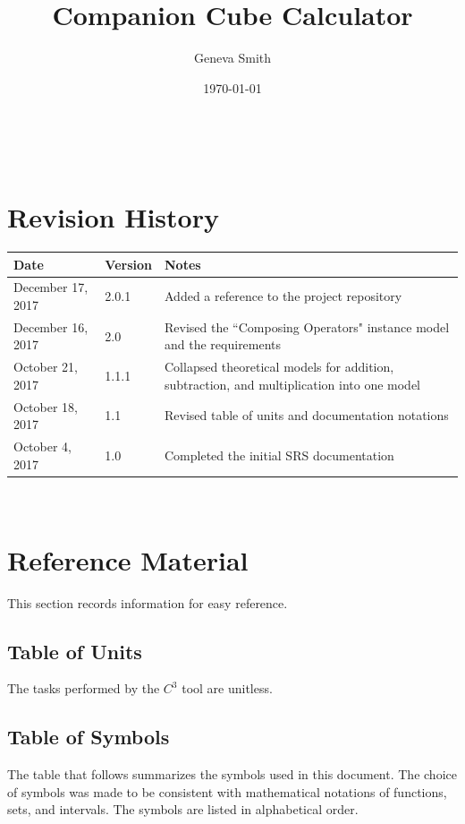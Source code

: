 \documentclass[12pt]{article}
\newcommand{\prognameAbbrv}{$C^{3}$}
\begin{document}
\title{Companion Cube Calculator} 
\author{Geneva Smith}
\date{\today}
	
\maketitle

~\newpage


\section{Revision History}

\begin{tabularx}{\textwidth}{p{3cm}p{2cm}X}
\toprule {\bf Date} & {\bf Version} & {\bf Notes}\\
\midrule
December 17, 2017 & 2.0.1 & Added a reference to the project repository \\
December 16, 2017 & 2.0 & Revised the ``Composing Operators" instance model and 
the requirements \\
October 21, 2017 & 1.1.1 & Collapsed theoretical models for addition, 
subtraction, and 
 multiplication into one model\\
October 18, 2017 & 1.1 & Revised table of units and documentation notations \\
October 4, 2017 & 1.0 & Completed the initial SRS documentation\\
\bottomrule
\end{tabularx}

~\newpage

\section{Reference Material}

This section records information for easy reference.

\subsection{Table of Units}

The tasks performed by the \prognameAbbrv{} tool are unitless.

\subsection{Table of Symbols}

The table that follows summarizes the symbols used in this document. The choice 
of symbols was made to be consistent with mathematical notations of functions, 
sets, and intervals. The symbols are listed in alphabetical order.
\end{document}
